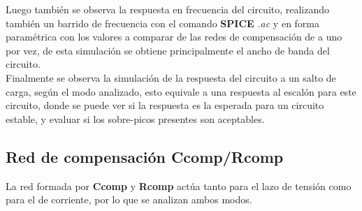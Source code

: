Luego también se observa la respuesta en frecuencia del circuito, realizando también un barrido de frecuencia con el comando \textbf{SPICE} \textit{.ac} y en forma paramétrica con los valores a comparar de las redes de compensación de a uno por vez, de esta simulación se obtiene principalmente el ancho de banda del circuito.\\

Finalmente se observa la simulación de la respuesta del circuito a un salto de carga, según el modo analizado, esto equivale a una respuesta al escalón para este circuito, donde se puede ver si la respuesta es la esperada para un circuito estable, y evaluar si los sobre-picos presentes son aceptables.\\







\clearpage


\subsection{Red de compensación Ccomp/Rcomp}

La red formada por \textbf{Ccomp} y \textbf{Rcomp} actúa tanto para el lazo de tensión como para el de corriente, por lo que se analizan ambos modos.

\clearpage





\clearpage




